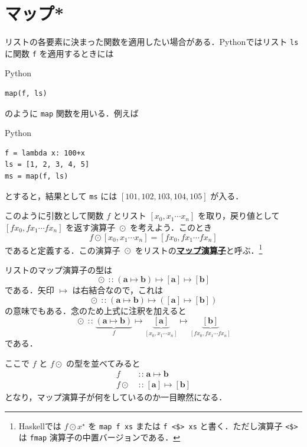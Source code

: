 \documentclass[a4paper,twocolumn]{jsbook}
\newcommand{\programminglanguage}[1]{\textsf{#1}}
\newcommand{\haskell}{\programminglanguage{Haskell}}
\newcommand{\python}{\programminglanguage{Python}}
\newcommand{\keyword}[1]{{\underline{\textbf{#1}}}}
\newcommand{\code}[1]{\texttt{#1}}
\newenvironment{pythoncode}{\begin{itembox}[r]{\python}}{\end{itembox}}
\DeclareMathOperator{\mIn}{{:\!:}}
\DeclareMathOperator{\mMapList}{\odot}
\DeclareMathOperator{\mMapsTo}{\mapsto}
\newcommand{\mType}[1]{\mathbf{#1}}
\newcommand{\mListWith}[1]{\left[#1\right]}
\newcommand{\mListType}[1]{\mListWith{\mType{#1}}}
\newcommand{\mList}[1]{{#1}^\mathrm{\star}}
\newcommand{\mProj}[2]{#1\mMapsTo#2}
\begin{document}
\section{マップ*}

リストの各要素に決まった関数を適用したい場合がある．\python ではリスト \code{ls} に関数 \code{f} を適用するときには
\begin{pythoncode}
\begin{verbatim}
map(f, ls)
\end{verbatim}
\end{pythoncode}
のように \code{map} 関数を用いる．例えば
\begin{pythoncode}
\begin{verbatim}
f = lambda x: 100+x
ls = [1, 2, 3, 4, 5]
ms = map(f, ls)
\end{verbatim}
\end{pythoncode}
とすると，結果として \code{ms} には $\mListWith{101,102,103,104,105}$ が入る．

このように引数として関数 $f$ とリスト $\mListWith{x_0,x_1\dotsb x_n}$ を取り，戻り値として $\mListWith{fx_0,fx_1\dotsb fx_n}$ を返す演算子 $\mMapList$ を考えよう．このとき
\begin{equation}
f\mMapList\mListWith{x_0,x_1\dotsb x_n}
=\mListWith{fx_0,fx_1\dotsb fx_n}
\end{equation}
であると定義する．この演算子 $\mMapList$ をリストの\keyword{マップ演算子}と呼ぶ．\footnote{\haskell では $f\mMapList\mList{x}$ を \code{map f xs} または \code{f <\$> xs} と書く．ただし演算子 \code{<\$>} は \code{fmap} 演算子の中置バージョンである．}

リストのマップ演算子の型は
\begin{equation}
\mMapList
\mIn{}
\mProj{
  (\mProj{\mType{a}}{\mType{b}})
}
{
  \mProj{\mListType{a}}{\mListType{b}}
}
\end{equation}
である．矢印 $\mMapsTo$ は右結合なので，これは
\begin{equation}
\mMapList
\mIn{}
\mProj{
  (\mProj{\mType{a}}{\mType{b}})
}
{
  (\mProj{\mListType{a}}{\mListType{b}})
}
\end{equation}
の意味でもある．念のため上式に注釈を加えると
\begin{equation}
\mMapList\mIn
\underbrace{\left(\mType{a}\mMapsTo\mType{b}\right)}_f
\mMapsTo
\underbrace{\mListType{a}}_{\mListWith{x_0,x_1\dotsb x_n}}
\mMapsTo
\underbrace{\mListType{b}}_{\mListWith{fx_0,fx_1\dotsb fx_n}}
\end{equation}
である．

ここで $f$ と $f\mMapList$ の型を並べてみると
\begin{align}
f&\mIn\mProj{\mType{a}}{\mType{b}}\\
f\mMapList&\mIn\mProj{\mListType{a}}{\mListType{b}}
\end{align}
となり，マップ演算子が何をしているのか一目瞭然になる．
\end{document}
